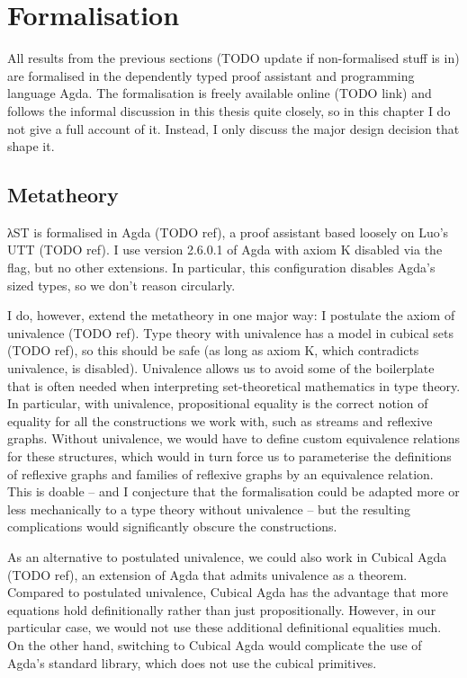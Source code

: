 \chapter{Formalisation}
\label{sec:formalisation}

All results from the previous sections (TODO update if non-formalised stuff is
in) are formalised in the dependently typed proof assistant and programming
language Agda. The formalisation is freely available online (TODO link) and
follows the informal discussion in this thesis quite closely, so in this chapter
I do not give a full account of it. Instead, I only discuss the major design
decision that shape it.


\section{Metatheory}
\label{sec:formalisation:metatheory}

λST is formalised in Agda (TODO ref), a proof assistant based loosely on Luo's
UTT (TODO ref). I use version 2.6.0.1 of Agda with axiom K disabled via the
 flag, but no other extensions. In particular, this
configuration disables Agda's sized types, so we don't reason circularly.

I do, however, extend the metatheory in one major way: I postulate the axiom of
univalence (TODO ref). Type theory with univalence has a model in cubical sets
(TODO ref), so this should be safe (as long as axiom K, which contradicts
univalence, is disabled). Univalence allows us to avoid some of the boilerplate
that is often needed when interpreting set-theoretical mathematics in type
theory. In particular, with univalence, propositional equality is the correct
notion of equality for all the constructions we work with, such as streams and
reflexive graphs. Without univalence, we would have to define custom equivalence
relations for these structures, which would in turn force us to parameterise the
definitions of reflexive graphs and families of reflexive graphs by an
equivalence relation. This is doable -- and I conjecture that the formalisation
could be adapted more or less mechanically to a type theory without univalence
-- but the resulting complications would significantly obscure the
constructions.

As an alternative to postulated univalence, we could also work in Cubical Agda
(TODO ref), an extension of Agda that admits univalence as a theorem. Compared
to postulated univalence, Cubical Agda has the advantage that more equations
hold definitionally rather than just propositionally. However, in our particular
case, we would not use these additional definitional equalities much. On the
other hand, switching to Cubical Agda would complicate the use of Agda's
standard library, which does not use the cubical primitives.

